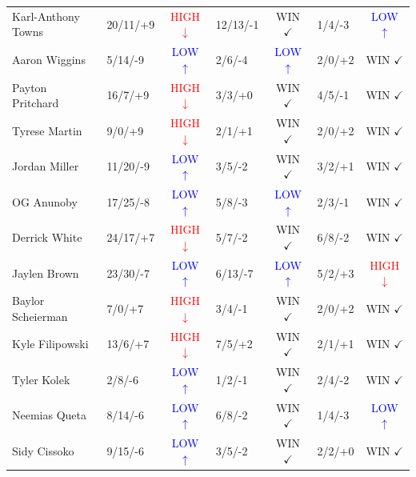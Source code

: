 \documentclass{article}
\begin{document}
\begin{table}[h]
\begin{tabular}{llclclc}
Karl-Anthony Towns & 20/11/+9 & \textcolor{red}{HIGH $\downarrow$} & 12/13/-1 & \textcolor{green!70!black}{WIN $\checkmark$} & 1/4/-3 & \textcolor{blue}{LOW $\uparrow$} \\
Aaron Wiggins & 5/14/-9 & \textcolor{blue}{LOW $\uparrow$} & 2/6/-4 & \textcolor{blue}{LOW $\uparrow$} & 2/0/+2 & \textcolor{green!70!black}{WIN $\checkmark$} \\
Payton Pritchard & 16/7/+9 & \textcolor{red}{HIGH $\downarrow$} & 3/3/+0 & \textcolor{green!70!black}{WIN $\checkmark$} & 4/5/-1 & \textcolor{green!70!black}{WIN $\checkmark$} \\
Tyrese Martin & 9/0/+9 & \textcolor{red}{HIGH $\downarrow$} & 2/1/+1 & \textcolor{green!70!black}{WIN $\checkmark$} & 2/0/+2 & \textcolor{green!70!black}{WIN $\checkmark$} \\
Jordan Miller & 11/20/-9 & \textcolor{blue}{LOW $\uparrow$} & 3/5/-2 & \textcolor{green!70!black}{WIN $\checkmark$} & 3/2/+1 & \textcolor{green!70!black}{WIN $\checkmark$} \\
OG Anunoby & 17/25/-8 & \textcolor{blue}{LOW $\uparrow$} & 5/8/-3 & \textcolor{blue}{LOW $\uparrow$} & 2/3/-1 & \textcolor{green!70!black}{WIN $\checkmark$} \\
Derrick White & 24/17/+7 & \textcolor{red}{HIGH $\downarrow$} & 5/7/-2 & \textcolor{green!70!black}{WIN $\checkmark$} & 6/8/-2 & \textcolor{green!70!black}{WIN $\checkmark$} \\
Jaylen Brown & 23/30/-7 & \textcolor{blue}{LOW $\uparrow$} & 6/13/-7 & \textcolor{blue}{LOW $\uparrow$} & 5/2/+3 & \textcolor{red}{HIGH $\downarrow$} \\
Baylor Scheierman & 7/0/+7 & \textcolor{red}{HIGH $\downarrow$} & 3/4/-1 & \textcolor{green!70!black}{WIN $\checkmark$} & 2/0/+2 & \textcolor{green!70!black}{WIN $\checkmark$} \\
Kyle Filipowski & 13/6/+7 & \textcolor{red}{HIGH $\downarrow$} & 7/5/+2 & \textcolor{green!70!black}{WIN $\checkmark$} & 2/1/+1 & \textcolor{green!70!black}{WIN $\checkmark$} \\
Tyler Kolek & 2/8/-6 & \textcolor{blue}{LOW $\uparrow$} & 1/2/-1 & \textcolor{green!70!black}{WIN $\checkmark$} & 2/4/-2 & \textcolor{green!70!black}{WIN $\checkmark$} \\
Neemias Queta & 8/14/-6 & \textcolor{blue}{LOW $\uparrow$} & 6/8/-2 & \textcolor{green!70!black}{WIN $\checkmark$} & 1/4/-3 & \textcolor{blue}{LOW $\uparrow$} \\
Sidy Cissoko & 9/15/-6 & \textcolor{blue}{LOW $\uparrow$} & 3/5/-2 & \textcolor{green!70!black}{WIN $\checkmark$} & 2/2/+0 & \textcolor{green!70!black}{WIN $\checkmark$} \\

\end{tabular}
\end{table}
\end{document}
